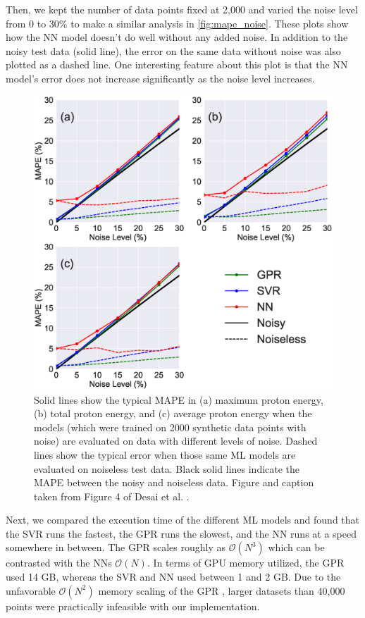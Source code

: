 Then, we kept the number of data points fixed at 2,000 and varied the noise level from 0 to 30\% to make a similar analysis in \autoref{fig:mape_noise}. These plots show how the \gls{NN} model doesn't do well without any added noise. In addition to the noisy test data (solid line), the error on the same data without noise was also plotted as a dashed line. One interesting feature about this plot is that the \gls{NN} model's error does not increase significantly as the noise level increases. 

\begin{figure}
	\centering 
	\includegraphics[width=0.75\linewidth]{planning/images/paper1/test_mape_points=2.0k.eps}
	\caption{Solid lines show the typical MAPE in (a) maximum proton energy, (b) total proton energy, and (c) average proton energy when the models (which were trained on 2000 synthetic data points with noise) are evaluated on data with different levels of noise. Dashed lines show the typical error when those same ML models are evaluated on noiseless test data. Black solid lines indicate the MAPE between the noisy and noiseless data. Figure and caption taken from Figure 4 of Desai et al. \cite{Desai_2024_CPP}.}
	\label{fig:mape_noise}
\end{figure}

Next, we compared the execution time of the different \gls{ML} models and found that the \gls{SVR} runs the fastest, the \gls{GPR} runs the slowest, and the \gls{NN} runs at a speed somewhere in between. The \gls{GPR} scales roughly as $\mathcal{O}(N^3)$ \cite{Wang_2019_GPytorch} which can be contrasted with the \gls{NN}s $\mathcal{O}(N)$. In terms of GPU memory utilized, the \gls{GPR} used 14 GB, whereas the \gls{SVR} and \gls{NN} used between 1 and 2 GB. Due to the unfavorable $\mathcal{O}(N^2)$ memory scaling of the \gls{GPR} \cite{Wang_2019_GPytorch}, larger datasets than 40,000 points were practically infeasible with our implementation.

